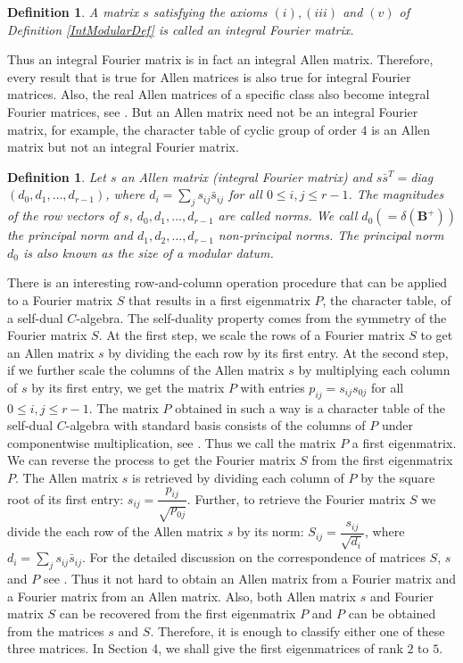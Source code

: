 \documentclass[12pt]{amsart}
\newtheorem{definition}[thm]{Definition}
\begin{document}
\begin{definition}
A matrix $s$ satisfying the axioms $(i), (iii)$ and $(v)$ of Definition \ref{IntModularDef}  is called an \emph{integral Fourier matrix}.
\end{definition}

Thus an integral Fourier matrix is in fact an integral Allen matrix. Therefore, every result that is true for Allen matrices is also true for integral Fourier matrices.
Also, the real Allen matrices of a specific class also become integral Fourier matrices, see \cite[Theorem 25]{G1}. But an Allen matrix need not be an integral Fourier matrix, for example, the character table of cyclic group of order $4$ is an Allen matrix but not an integral Fourier matrix.

\begin{definition}
Let $s$ an Allen matrix (integral Fourier matrix) and $s \bar s^T=$diag$(d_0,d_1,\hdots, d_{r-1})$, where $d_i=\sum_js_{ij}\bar s_{ij}$ for all $0\leq i,j\leq r-1$. The magnitudes of the row vectors of $s$, $d_0,d_1,\hdots,d_{r-1}$ are called norms. We call $d_0 (=\delta({{\mathbf B}}^+))$ the principal norm and $d_1,d_2,\hdots,d_{r-1}$  non-principal norms. The principal norm $d_0$ is also known as the \emph{size of a modular datum}.
\end{definition}

There is an interesting row-and-column operation procedure that can be applied to a Fourier matrix $S$ that results in a first eigenmatrix $P$, the character table, of a self-dual $C$-algebra. The self-duality property comes from the symmetry of the Fourier matrix $S$.
At the first step, we scale the rows of a Fourier matrix $S$ to get an Allen matrix $s$ by dividing the each row by its first entry. At the second step, if we further scale the columns of the Allen matrix $s$ by multiplying each column of $s$ by its first entry, we get the matrix $P$ with entries $p_{ij}=s_{ij}s_{0j}$ for all $0\leq i,j\leq r-1$. The matrix $P$ obtained in such a way is a character table of the self-dual $C$-algebra with standard basis consists of the columns of $P$ under componentwise multiplication, see \cite[Theorem 11]{G1}. Thus we call the matrix $P$ a first eigenmatrix.
We can reverse the process to get the Fourier matrix $S$ from the first eigenmatrix $P$. The Allen matrix $s$ is retrieved by dividing each column of $P$ by the square root of its first entry: $s_{ij} = \dfrac{p_{ij}}{\sqrt{p_{0j}}}$. Further, to retrieve the Fourier matrix $S$ we divide the each row of the Allen matrix $s$ by its norm: $S_{ij}=\dfrac{s_{ij}}{\sqrt{d_i}}$, where $d_{i}=\sum_js_{ij}\bar s_{ij}$. For the detailed discussion on the correspondence of matrices $S$, $s$ and $P$ see \cite{G1}. Thus it not hard to obtain an Allen matrix from a Fourier matrix and a Fourier matrix from an Allen matrix. Also, both Allen matrix $s$ and Fourier matrix  $S$ can be recovered  from the first eigenmatrix $P$ and $P$ can be  obtained from the matrices $s$  and $S$. Therefore, it is enough to classify either one of these three matrices. In Section 4, we shall give the first eigenmatrices of rank $2$ to $5$.
\end{document}
